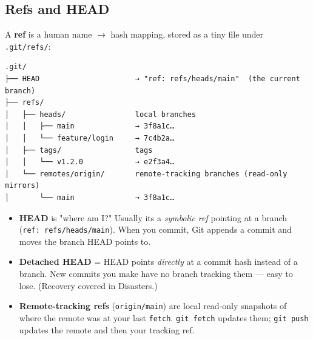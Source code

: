 \documentclass[11pt]{article}
\providecommand{\tightlist}{\setlength{\itemsep}{1pt}\setlength{\parskip}{0pt}}
\newenvironment{Shaded}{\begin{snugshade}}{\end{snugshade}}
\newcommand{\AttributeTok}[1]{\textcolor[rgb]{0.16,0.50,0.73}{#1}}
\newcommand{\CommentTok}[1]{\textcolor[rgb]{0.48,0.49,0.49}{#1}}
\newcommand{\ExtensionTok}[1]{\textcolor[rgb]{0.00,0.60,1.00}{\textbf{#1}}}
\newcommand{\FunctionTok}[1]{\textcolor[rgb]{0.56,0.27,0.68}{#1}}
\newcommand{\KeywordTok}[1]{\textcolor[rgb]{0.81,0.81,0.76}{\textbf{#1}}}
\newcommand{\NormalTok}[1]{\textcolor[rgb]{0.81,0.81,0.76}{#1}}
\newcommand{\PreprocessorTok}[1]{\textcolor[rgb]{0.15,0.68,0.38}{#1}}
\begin{document}

\begin{Shaded}
\end{Shaded}

\subsection{Refs and HEAD}\label{refs-and-head}

A \textbf{ref} is a human name \(\rightarrow\) hash mapping, stored as a tiny file under \texttt{.git/refs/}:

\setcodelang{}

\begin{verbatim}
.git/
├── HEAD                      → "ref: refs/heads/main"  (the current branch)
├── refs/
│   ├── heads/                local branches
│   │   ├── main              → 3f8a1c…
│   │   └── feature/login     → 7c4b2a…
│   ├── tags/                 tags
│   │   └── v1.2.0            → e2f3a4…
│   └── remotes/origin/       remote-tracking branches (read-only mirrors)
│       └── main              → 3f8a1c…
\end{verbatim}

\begin{itemize}
\tightlist
\item
  \textbf{HEAD} is "where am I?" Usually it\textquotesingle s a \emph{symbolic ref} pointing at a branch (\texttt{ref:\ refs/heads/main}). When you commit, Git appends a commit and moves the branch HEAD points to.
\item
  \textbf{Detached HEAD} = HEAD points \emph{directly} at a commit hash instead of a branch. New commits you make have no branch tracking them --- easy to lose. (Recovery covered in Disasters.)
\item
  \textbf{Remote-tracking refs} (\texttt{origin/main}) are local read-only snapshots of where the remote was at your last \texttt{fetch}. \texttt{git\ fetch} updates them; \texttt{git\ push} updates the remote and then your tracking ref.
\end{itemize}
\end{document}
